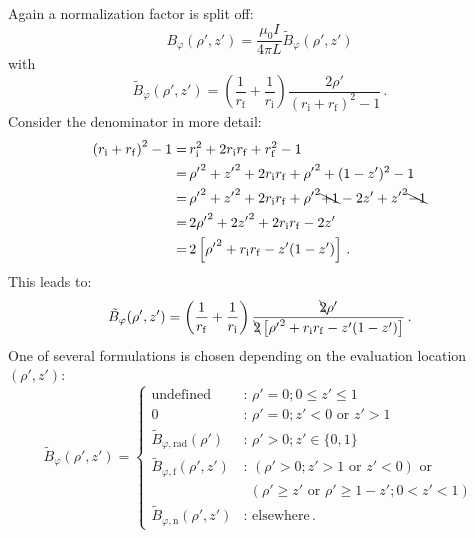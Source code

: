 Again a normalization factor is split off:
\begin{equation}
  B_\varphi(\rho', z') = \frac{\mu_0 I}{4 \pi L} \tilde{B}_\varphi(\rho', z')
\end{equation}
with
\begin{equation}
  \tilde{B}_\varphi(\rho', z')
  = \left(\frac{1}{r_\mathrm{f}} + \frac{1}{r_\mathrm{i}} \right)
    \frac{2 \rho'}{\left( r_\mathrm{i} + r_\mathrm{f} \right)^2 - 1} \, .
\end{equation}
Consider the denominator in more detail:
\begin{align}
 \left(r_\mathrm{i} + r_\mathrm{f}\right)^2 - 1
 =&\, r_\mathrm{i}^2 + 2 r_\mathrm{i} r_\mathrm{f} + r_\mathrm{f}^2 - 1 \nonumber \\
 =&\, {\rho'}^2 + {z'}^2 + 2 r_\mathrm{i} r_\mathrm{f} + {\rho'}^2 + (1 - z')^2 - 1 \nonumber \\
 =&\, {\rho'}^2 + {z'}^2 + 2 r_\mathrm{i} r_\mathrm{f} + {\rho'}^2 \bcancel{+ 1} - 2 z' + {z'}^2 \bcancel{- 1} \nonumber \\
 =&\, 2 {\rho'}^2 + 2 {z'}^2 + 2 r_\mathrm{i} r_\mathrm{f} - 2 z' \nonumber \\
 =&\, 2 \left[ {\rho'}^2 + r_\mathrm{i} r_\mathrm{f} - z' (1 - z') \right] \, .
\end{align}
This leads to:
\begin{equation}
 \tilde{B}_\varphi(\rho', z')
  = \left(\frac{1}{r_\mathrm{f}} + \frac{1}{r_\mathrm{i}} \right)
    \frac{\bcancel{2} \rho'}{\bcancel{2} \left[ {\rho'}^2 + r_\mathrm{i} r_\mathrm{f} - z' (1 - z') \right]} \, . \label{eqn:bPhiTilde}
\end{equation}
One of several formulations is chosen depending on the evaluation location~$(\rho', z')$:
\begin{equation}
  \tilde{B}_\varphi (\rho', z') =
  \begin{cases}
    \textrm{undefined}                           &:\, \rho' = 0; 0 \leq z' \leq 1 \\
    0                                            &:\, \rho' = 0; z' < 0 \textrm{ or } z' > 1 \\
    \tilde{B}_{\varphi,\mathrm{rad}} (\rho')     &:\, \rho' > 0; z' \in \{0, 1\} \\
    \tilde{B}_{\varphi,\mathrm{f}}   (\rho', z') &:\, (\rho' > 0; z' > 1 \textrm{ or } z' < 0) \textrm{ or } \\
                                            ~    &~~  (\rho' \geq z' \textrm{ or } \rho' \geq 1-z'; 0 < z' < 1) \\
    \tilde{B}_{\varphi,\mathrm{n}}   (\rho', z') &:\, \textrm{elsewhere} \, .
  \end{cases} \label{eqn:sws_B_phi_switchover}
\end{equation}
